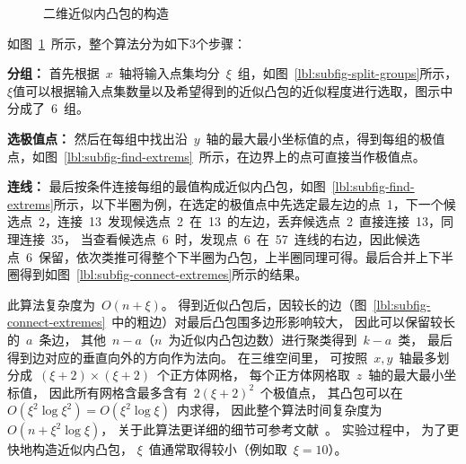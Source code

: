 \begin{figure}[htbp]
  \centering
   \hspace{0.5cm}
  \linebreak
   \hspace{0.5cm}
  \hspace{2em}
   \hspace{0.5cm}
  \caption{二维近似内凸包的构造\cite{bentley1982approximation}}
\label{lbl:ach-2d}
\end{figure}

如图~\ref{lbl:ach-2d}~所示，整个算法分为如下3个步骤：

\begin{inparaenum}[(1)]
\item \textbf{分组：}
首先根据~$x$~轴将输入点集均分~$\xi$~组，如图~\ref{lbl:subfig-split-groups}所示，$\xi$值可以根据输入点集数量以及希望得到的近似凸包的近似程度进行选取，图示中分成了~6~组。\\
\indent \item \textbf{选极值点：}
然后在每组中找出沿~$y$~轴的最大最小坐标值的点，得到每组的极值点，如图~\ref{lbl:subfig-find-extrems}~所示，在边界上的点可直接当作极值点。\\
\indent \item \textbf{连线：}
最后按条件连接每组的最值构成近似内凸包，如图~\ref{lbl:subfig-find-extrems}所示，以下半圈为例，在选定的极值点中先选定最左边的点~1，下一个候选点~2，连接~13~发现候选点~2~在~13~的左边，丢弃候选点~2~直接连接~13，同理连接~35，
当查看候选点~6~时，发现点~6~在~57~连线的右边，因此候选点~6~保留，依次类推可得整个下半圈为凸包，上半圈同理可得。最后合并上下半圈得到如图~\ref{lbl:subfig-connect-extremes}所示的结果。
\end{inparaenum}

此算法复杂度为~$O(n+\xi)$。  
得到近似凸包后，因较长的边（图~\ref{lbl:subfig-connect-extremes}~中的粗边）对最后凸包围多边形影响较大， 因此可以保留较长的~$a$~条边， 其他~$n-a$（$n$~为近似内凸包边数）进行聚类得到~$k-a$~类， 最后得到边对应的垂直向外的方向作为法向。
在三维空间里， 可按照~$x,y$~轴最多划分成~$(\xi+2)\times (\xi+2)$~个正方体网格， 每个正方体网格取~$z$~轴的最大最小坐标值， 因此所有网格含最多含有~$2(\xi+2)^2$~个极值点， 其凸包可以在~$O(\xi^2\log \xi^2) = O(\xi^2\log \xi)$~内求得， 因此整个算法时间复杂度为~$O(n+\xi^2\log\xi)$， 
关于此算法更详细的细节可参考文献~。 实验过程中， 为了更快地构造近似内凸包， $\xi$~值通常取得较小（例如取~$\xi=10$）。

